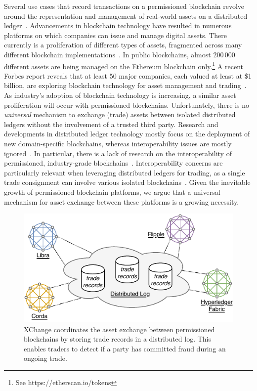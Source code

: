Several use cases that record transactions on a permissioned blockchain revolve around the representation and management of real-world assets on a distributed ledger~\cite{hewett2019inclusive}.
Advancements in blockchain technology have resulted in numerous platforms on which companies can issue and manage digital assets.
There currently is a proliferation of different types of assets, fragmented across many different blockchain implementations~\cite{borkowski2018towards}.
In public blockchains, almost 200\,000 different assets are being managed on the Ethereum blockchain only.\footnote{See https://etherscan.io/tokens}
A recent Forbes report reveals that at least 50 major companies, each valued at least at \$1 billion, are exploring blockchain technology for asset management and trading~\cite{forbes50companies}.
As industry's adoption of blockchain technology is increasing, a similar asset proliferation will occur with permissioned blockchains.
Unfortunately, there is no \emph{universal} mechanism to exchange (trade) assets between isolated distributed ledgers without the involvement of a trusted third party.
Research and developments in distributed ledger technology mostly focus on the deployment of new domain-specific blockchains, whereas interoperability issues are mostly ignored~\cite{schulte2019towards,yli2016current}.
In particular, there is a lack of research on the interoperability of permissioned, industry-grade blockchains~\cite{nikander2019interledger,vo2018internet}.
Interoperability concerns are particularly relevant when leveraging distributed ledgers for trading, as a single trade consignment can involve various isolated blockchains~\cite{ganne2018can}.
Given the inevitable growth of permissioned blockchain platforms, we argue that a universal mechanism for asset exchange between these platforms is a growing necessity.

\begin{figure}[t]
	\centering
	\includegraphics[width=.8\linewidth]{xchange/assets/xchange_interoperability}
	\caption{XChange coordinates the asset exchange between permissioned blockchains by storing trade records in a distributed log. This enables traders to detect if a party has committed fraud during an ongoing trade.}
	\label{fig:xchange_interoperability}
\end{figure}

